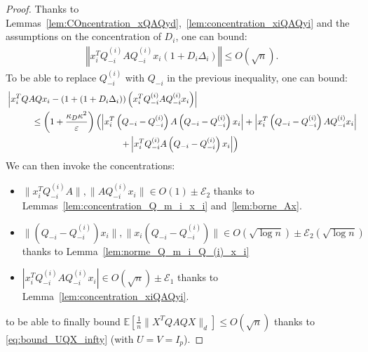 \documentclass[a4papaer, titlepage]{book}
\begin{document}
\begin{proof}
Thanks to Lemmas~\ref{lem:COncentration_xQAQyd},~\ref{lem:concentration_xiQAQyi} and the assumptions on the concentration of $D_i$, one can bound:
\begin{align*}
  \left\Vert x_i^TQ_{-i}^{(i)}AQ_{-i}^{(i)}x_i(1 + D_i \Delta_i) \right\Vert \leq O(\sqrt n).
\end{align*}
To be able to replace $Q_{-i}^{(i)}$ with $Q_{-i}$ in the previous inequality, one can bound:
\begin{align*}
  &\left\vert x_i^TQAQx_i
  - \left( 1 + (1 + D_i \Delta_i) \right)\left(  x_i^TQ_{-i}^{(i)}AQ_{-i}^{(i)}x_i \right) \right\vert\\
  &\hspace{1cm}\leq \left( 1 + \frac{\kappa_D\kappa^2}{\varepsilon} \right)\left( \left\vert x_i^T \left( Q_{-i} - Q_{-i}^{(i)} \right)A \left( Q_{-i} - Q_{-i}^{(i)} \right)x_i \right\vert + \left\vert x_i^T \left( Q_{-i} - Q_{-i}^{(i)} \right)AQ_{-i}^{(i)}x_i \right\vert \right.\\
  &\hspace{4.5cm} \left. + \left\vert x_i^TQ_{-i}^{(i)} A  \left( Q_{-i} - Q_{-i}^{(i)} \right)x_i \right\vert  \right)
\end{align*}
We can then invoke the concentrations:
\begin{itemize}
  \item $\|x_i^TQ_{-i}^{(i)} A\|, \|AQ_{-i}^{(i)} x_i\| \in O(1) \pm \mathcal E_2$ thanks to Lemmas~\ref{lem:concentration_Q_m_i_x_i} and~\ref{lem:borne_Ax}.
  \item $\|(Q_{-i} - Q_{-i}^{(i)})x_i\|, \|x_i(Q_{-i} - Q_{-i}^{(i)})\| \in O(\sqrt {\log n}) \pm \mathcal E_2(\sqrt {\log n})$ thanks to Lemma~\ref{lem:norme_Q_m_i_Q_(i)_x_i}
  \item $\left\vert x_i^TQ_{-i}^{(i)}AQ_{-i}^{(i)}x_i \right\vert \in O(\sqrt n) \pm \mathcal E_1 $ thanks to Lemma~\ref{lem:concentration_xiQAQyi}.
\end{itemize}
to be able to finally bound $\mathbb E[\frac{1}{n}\|X^TQAQX\|_d] \leq O(\sqrt n)$ thanks to \eqref{eq:bound_UQX_infty} (with $U=V=I_p$).

\end{proof}
\end{document}
